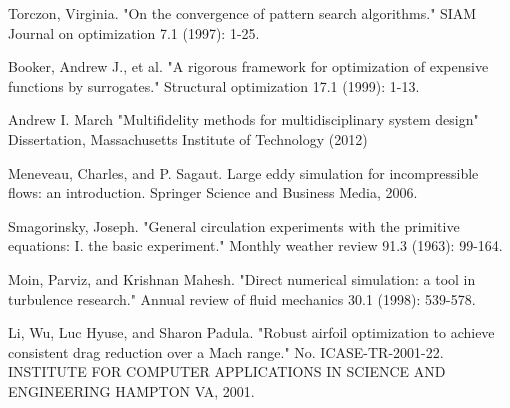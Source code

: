 \documentclass[a4paper,onecolumn]{article}
\theoremstyle{remark}
\begin{document}
\begin{thebibliography}{9}
Torczon, Virginia. 
"On the convergence of pattern search algorithms." 
SIAM Journal on optimization 7.1 (1997): 1-25.

Booker, Andrew J., et al. 
"A rigorous framework for optimization of expensive functions by surrogates." 
Structural optimization 17.1 (1999): 1-13.

Andrew I. March
"Multifidelity methods for multidisciplinary system design"
Dissertation, Massachusetts Institute of Technology (2012)

Meneveau, Charles, and P. Sagaut. 
Large eddy simulation for incompressible flows: an introduction.
Springer Science and Business Media, 2006.

Smagorinsky, Joseph. 
"General circulation experiments with the primitive equations: I. the basic experiment." 
Monthly weather review 91.3 (1963): 99-164.

Moin, Parviz, and Krishnan Mahesh. 
"Direct numerical simulation: a tool in turbulence research." 
Annual review of fluid mechanics 30.1 (1998): 539-578.

Li, Wu, Luc Hyuse, and Sharon Padula. 
"Robust airfoil optimization to achieve consistent drag reduction over a Mach range."
No. ICASE-TR-2001-22. INSTITUTE FOR COMPUTER APPLICATIONS IN SCIENCE AND ENGINEERING HAMPTON VA, 2001.

\end{thebibliography}
\end{document}
